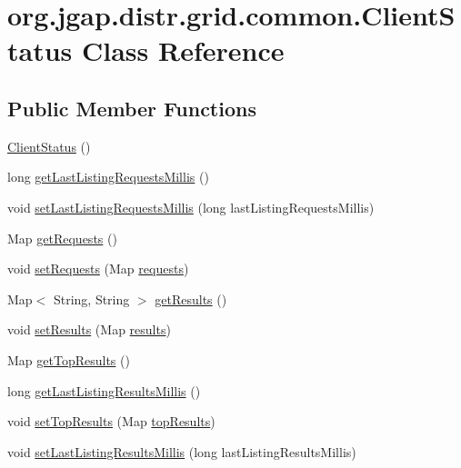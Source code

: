 \hypertarget{classorg_1_1jgap_1_1distr_1_1grid_1_1common_1_1_client_status}{\section{org.\-jgap.\-distr.\-grid.\-common.\-Client\-Status Class Reference}
\label{classorg_1_1jgap_1_1distr_1_1grid_1_1common_1_1_client_status}
}
\subsection*{Public Member Functions}
\begin{DoxyCompactItemize}
\item 
\hyperlink{classorg_1_1jgap_1_1distr_1_1grid_1_1common_1_1_client_status_a255c94642929dc9361f6f2903e527443}{Client\-Status} ()
\item 
long \hyperlink{classorg_1_1jgap_1_1distr_1_1grid_1_1common_1_1_client_status_a3266ec64c07021203ddfb955aadaff62}{get\-Last\-Listing\-Requests\-Millis} ()
\item 
void \hyperlink{classorg_1_1jgap_1_1distr_1_1grid_1_1common_1_1_client_status_a2467b3cdbbd89b201f60c71266ed92bd}{set\-Last\-Listing\-Requests\-Millis} (long last\-Listing\-Requests\-Millis)
\item 
Map \hyperlink{classorg_1_1jgap_1_1distr_1_1grid_1_1common_1_1_client_status_a65bce88ac143f6acaa45932850b228c3}{get\-Requests} ()
\item 
void \hyperlink{classorg_1_1jgap_1_1distr_1_1grid_1_1common_1_1_client_status_a4432ff8815b29420f5dd4928cc62d53d}{set\-Requests} (Map \hyperlink{classorg_1_1jgap_1_1distr_1_1grid_1_1common_1_1_client_status_a0afa5f4c9a0b5a684fb486e67858306b}{requests})
\item 
Map$<$ String, String $>$ \hyperlink{classorg_1_1jgap_1_1distr_1_1grid_1_1common_1_1_client_status_adbc0834e312d0900b6eb314ec91feaf3}{get\-Results} ()
\item 
void \hyperlink{classorg_1_1jgap_1_1distr_1_1grid_1_1common_1_1_client_status_a6e28b6b99cdf47e33770181c0b875731}{set\-Results} (Map \hyperlink{classorg_1_1jgap_1_1distr_1_1grid_1_1common_1_1_client_status_a2ca3e7f0916d416de51230724aaae46d}{results})
\item 
Map \hyperlink{classorg_1_1jgap_1_1distr_1_1grid_1_1common_1_1_client_status_a32ca83d71f4ffd040fd6e1fbe9918b19}{get\-Top\-Results} ()
\item 
long \hyperlink{classorg_1_1jgap_1_1distr_1_1grid_1_1common_1_1_client_status_ab76a221ace3d6f5bf709e6e912432d7d}{get\-Last\-Listing\-Results\-Millis} ()
\item 
void \hyperlink{classorg_1_1jgap_1_1distr_1_1grid_1_1common_1_1_client_status_a48cfbe3db06e727a7f3a94f1407be715}{set\-Top\-Results} (Map \hyperlink{classorg_1_1jgap_1_1distr_1_1grid_1_1common_1_1_client_status_a2223b5599789c9241742767afb0317bd}{top\-Results})
\item 
void \hyperlink{classorg_1_1jgap_1_1distr_1_1grid_1_1common_1_1_client_status_a6cdf5cd5d28a7c456447b4e3e1561c6d}{set\-Last\-Listing\-Results\-Millis} (long last\-Listing\-Results\-Millis)
\end{DoxyCompactItemize}
